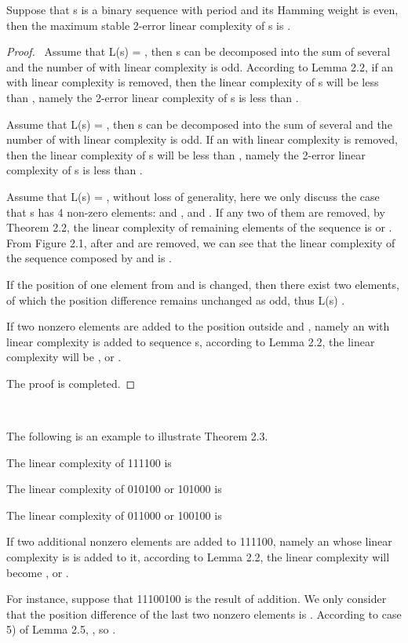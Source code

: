 \documentclass[10pt,conference,twocolumn]{IEEEtran}
\begin{document}
 Suppose that s is a binary sequence with
period  and its Hamming weight is even, then the maximum stable
2-error linear complexity of s is .


\begin{proof}\ Assume that L(s) = , then s can be decomposed into the sum of several  and
the number of  with linear complexity  is odd.
According to Lemma 2.2, if an  with linear complexity
 is removed, then the linear complexity of s will be less
than , namely the 2-error linear complexity of s is less than
.

Assume that L(s) = , then s can be decomposed into the sum of
several  and the number of  with linear complexity
 is odd. If an  with linear complexity  is
removed, then the linear complexity of s will be less than ,
namely the 2-error linear complexity of s is less than .

Assume that L(s) = , without loss of generality, here we only
discuss the case that s has 4 non-zero elements:  and
, and . If any two of them are
removed, by Theorem 2.2, the linear complexity of remaining elements
of the sequence is  or . From Figure 2.1, after 
and  are removed, we can see that the linear complexity of the
sequence composed by  and  is .

If the position of one element from  and  is
changed, then there exist two elements, of which the position
difference remains unchanged as odd, thus L(s)  .

If two nonzero elements are added to the position outside  and , namely an  with linear complexity 
is added to sequence s, according to Lemma 2.2, the linear
complexity will be ,  or .

The proof is completed.
\end{proof}\

The following is an example to illustrate Theorem 2.3.

 The linear
complexity of 111100 is 

The linear complexity of 010100 or 101000 is 

The linear complexity of 011000 or 100100 is 

If two additional nonzero elements are added to 111100,
namely an  whose linear complexity is  is added to
it, according to Lemma 2.2, the linear complexity will become
,  or .

For instance, suppose that 11100100 is the result of
addition. We only consider that the position difference of the last
two nonzero elements is . According to case 5) of Lemma 2.5,
, so .
\end{document}
